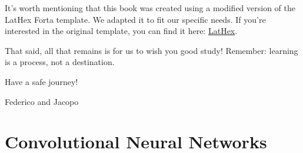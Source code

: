 \documentclass[11pt,fleqn,oneside]{book} %
\begin{document}
It's worth mentioning that this book was created using a modified version of the LatHex Forta template. We adapted it to fit our specific needs. If you're interested in the original template, you can find it here: \href{https://github.com/apehex/lathex-template}{LatHex}. 


That said, all that remains is for us to wish you good study! Remember: learning is a process, not a destination. 

Have a safe journey!

\hfill Federico and Jacopo
\newpage
\tableofcontents


% 

% 

% 

% 

\newpage
\chapter{Convolutional Neural Networks}


% 
\end{document}
